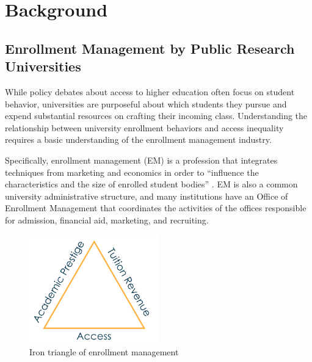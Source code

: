 \documentclass{article}
\begin{document}
\section*{Background}
\subsection*{Enrollment Management by Public Research Universities}

While policy debates about access to higher education often focus on student behavior, universities are purposeful about which students they pursue and expend substantial resources on crafting their incoming class. Understanding the relationship between university enrollment behaviors and access inequality requires a basic understanding of the enrollment management industry. 

Specifically, enrollment management (EM) is a profession that integrates techniques from marketing and economics in order to ``influence the characteristics and the size of enrolled student bodies'' \citep{RN2771}. EM is also a common university administrative structure, and many institutions have an Office of Enrollment Management that coordinates the activities of the offices responsible for admission, financial aid, marketing, and recruiting.

\begin{figure}[!ht]
    \centering
    \includegraphics[width=0.5\textwidth]{assets/images/iron_triangle.png}
    \caption{Iron triangle of enrollment management}
    \label{fig:iron_triangle}
\end{figure}
\end{document}
